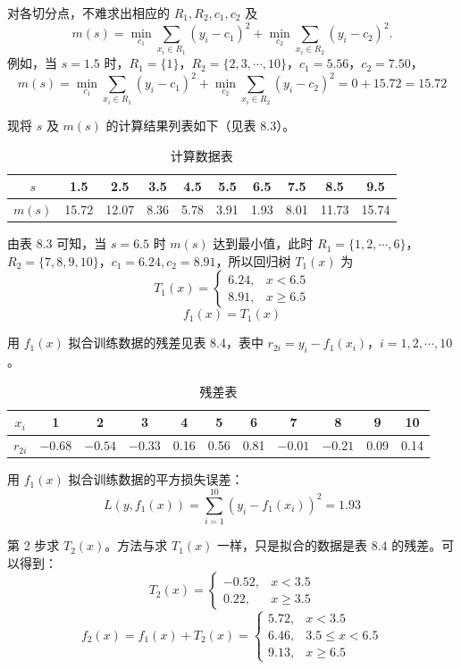 \documentclass[UTF8, 12pt, fontset=fandol, oneside]{ctexart}
\begin{document}
对各切分点，不难求出相应的 $R_1,R_2,c_1,c_2$ 及
\[
m(s)=\min_{c_1}\sum_{x_i\in R_1}(y_i-c_1)^2
+\min_{c_2}\sum_{x_i\in R_2}(y_i-c_2)^2.
\]
例如，当 $s=1.5$ 时，$R_1=\{1\}$，$R_2=\{2,3,\cdots,10\}$，$c_1=5.56$，$c_2=7.50$，
\[
m(s)=\min_{c_1}\sum_{x_i\in R_1}(y_i-c_1)^2
+\min_{c_2}\sum_{x_i\in R_2}(y_i-c_2)^2=0+15.72=15.72
\]

现将 $s$ 及 $m(s)$ 的计算结果列表如下（见表 8.3）。

\begin{table}[htbp]
\centering
\caption{计算数据表}
\begin{tabular}{c*{9}{c}}
\toprule
$s$ & 1.5 & 2.5 & 3.5 & 4.5 & 5.5 & 6.5 & 7.5 & 8.5 & 9.5\\
\midrule
$m(s)$ & 15.72 & 12.07 & 8.36 & 5.78 & 3.91 & 1.93 & 8.01 & 11.73 & 15.74\\
\bottomrule
\end{tabular}
\end{table}

由表 8.3 可知，当 $s=6.5$ 时 $m(s)$ 达到最小值，此时 $R_1=\{1,2,\cdots,6\}$，$R_2=\{7,8,9,10\}$，$c_1=6.24,c_2=8.91$，所以回归树 $T_1(x)$ 为
\[
T_1(x)=
\begin{cases}
6.24, & x<6.5\\
8.91, & x\geq 6.5
\end{cases}
\]
\[
f_1(x)=T_1(x)
\]

用 $f_1(x)$ 拟合训练数据的残差见表 8.4，表中 $r_{2i}=y_i-f_1(x_i)$，$i=1,2,\cdots,10$。

\begin{table}[htbp]
\centering
\caption{残差表}
\begin{tabular}{c*{10}{c}}
\toprule
$x_i$ & 1 & 2 & 3 & 4 & 5 & 6 & 7 & 8 & 9 & 10\\
\midrule
$r_{2i}$ & $-0.68$ & $-0.54$ & $-0.33$ & 0.16 & 0.56 & 0.81 & $-0.01$ & $-0.21$ & 0.09 & 0.14\\
\bottomrule
\end{tabular}
\end{table}

用 $f_1(x)$ 拟合训练数据的平方损失误差：
\[
L(y,f_1(x))=\sum_{i=1}^{10}(y_i-f_1(x_i))^2=1.93
\]

第 2 步求 $T_2(x)$。方法与求 $T_1(x)$ 一样，只是拟合的数据是表 8.4 的残差。可以得到：
\[
T_2(x)=
\begin{cases}
-0.52, & x<3.5\\
0.22, & x\geq 3.5
\end{cases}
\]
\[
f_2(x)=f_1(x)+T_2(x)=
\begin{cases}
5.72, & x<3.5\\
6.46, & 3.5\leq x<6.5\\
9.13, & x\geq 6.5
\end{cases}
\]
\end{document}
